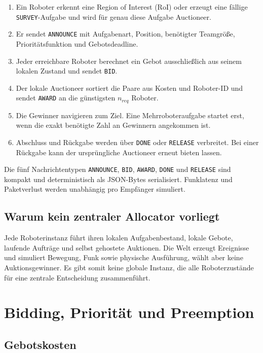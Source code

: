 \documentclass[11pt,a4paper]{article}
\begin{document}
\begin{enumerate}
  \item Ein Roboter erkennt eine Region of Interest (RoI) oder erzeugt eine fällige
        \texttt{SURVEY}-Aufgabe und wird für genau diese Aufgabe Auctioneer.
  \item Er sendet \texttt{ANNOUNCE} mit Aufgabenart, Position, benötigter Teamgröße,
        Prioritätsfunktion und Gebotsdeadline.
  \item Jeder erreichbare Roboter berechnet ein Gebot ausschließlich aus seinem lokalen
        Zustand und sendet \texttt{BID}.
  \item Der lokale Auctioneer sortiert die Paare aus Kosten und Roboter-ID und sendet
        \texttt{AWARD} an die günstigsten $n_{req}$ Roboter.
  \item Die Gewinner navigieren zum Ziel. Eine Mehrroboteraufgabe startet erst, wenn die
        exakt benötigte Zahl an Gewinnern angekommen ist.
  \item Abschluss und Rückgabe werden über \texttt{DONE} oder \texttt{RELEASE}
        verbreitet. Bei einer Rückgabe kann der ursprüngliche Auctioneer erneut bieten
        lassen.
\end{enumerate}

Die fünf Nachrichtentypen \texttt{ANNOUNCE}, \texttt{BID}, \texttt{AWARD},
\texttt{DONE} und \texttt{RELEASE} sind kompakt und deterministisch als JSON-Bytes
serialisiert. Funklatenz und Paketverlust werden unabhängig pro Empfänger simuliert.

\subsection{Warum kein zentraler Allocator vorliegt}

Jede Roboterinstanz führt ihren lokalen Aufgabenbestand, lokale Gebote, laufende
Aufträge und selbst gehostete Auktionen. Die Welt erzeugt Ereignisse und simuliert
Bewegung, Funk sowie physische Ausführung, wählt aber keine Auktionsgewinner. Es gibt
somit keine globale Instanz, die alle Roboterzustände für eine zentrale Entscheidung
zusammenführt.

\section{Bidding, Priorität und Preemption}

\subsection{Gebotskosten}
\end{document}
